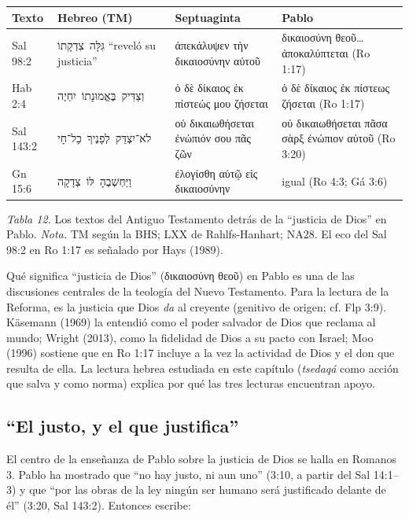 \documentclass[11pt,letterpaper]{article}
\newcommand{\heb}[1]{\mbox{\foreignlanguage{hebrew}{#1}}}
\newcommand{\grc}[1]{\foreignlanguage{ancientgreek}{#1}}
\begin{document}
\begin{center}\small\renewcommand{\arraystretch}{1.2}
\begin{tabular}{@{}L{2.4cm}L{4.4cm}L{4.4cm}L{3.4cm}@{}}
\toprule
\textbf{Texto} & \textbf{Hebreo (TM)} & \textbf{Septuaginta} & \textbf{Pablo} \\ \midrule
Sal 98:2 & \heb{גִּלָּה צִדְקָתוֹ} ``reveló su justicia'' & \grc{ἀπεκάλυψεν τὴν δικαιοσύνην αὐτοῦ} & \grc{δικαιοσύνη θεοῦ\ldots{} ἀποκαλύπτεται} (Ro 1:17) \\
Hab 2:4 & \heb{וְצַדִּיק בֶּאֱמוּנָתוֹ יִחְיֶה} & \grc{ὁ δὲ δίκαιος ἐκ πίστεώς μου ζήσεται} & \grc{ὁ δὲ δίκαιος ἐκ πίστεως ζήσεται} (Ro 1:17) \\
Sal 143:2 & \heb{לֹא־יִצְדַּק לְפָנֶיךָ כָל־חָי} & \grc{οὐ δικαιωθήσεται ἐνώπιόν σου πᾶς ζῶν} & \grc{οὐ δικαιωθήσεται πᾶσα σὰρξ ἐνώπιον αὐτοῦ} (Ro 3:20) \\
Gn 15:6 & \heb{וַיַּחְשְׁבֶהָ לּוֹ צְדָקָה} & \grc{ἐλογίσθη αὐτῷ εἰς δικαιοσύνην} & igual (Ro 4:3; Gá 3:6) \\
\bottomrule
\end{tabular}\par
{\footnotesize\color{gris}\textit{Tabla 12.} Los textos del Antiguo Testamento detrás de la ``justicia de Dios'' en Pablo. \textit{Nota.} TM según la BHS; LXX de Rahlfs-Hanhart; NA28. El eco del Sal 98:2 en Ro 1:17 es señalado por Hays (1989).}
\end{center}

\begin{nota}[Precisión]
Qué significa ``justicia de Dios'' (\grc{δικαιοσύνη θεοῦ}) en Pablo es una de las discusiones centrales de la teología del Nuevo Testamento. Para la lectura de la Reforma, es la justicia que Dios \emph{da} al creyente (genitivo de origen; cf. Flp 3:9). Käsemann (1969) la entendió como el poder salvador de Dios que reclama al mundo; Wright (2013), como la fidelidad de Dios a su pacto con Israel; Moo (1996) sostiene que en Ro 1:17 incluye a la vez la actividad de Dios y el don que resulta de ella. La lectura hebrea estudiada en este capítulo (\emph{tsedaqá} como acción que salva y como norma) explica por qué las tres lecturas encuentran apoyo.
\end{nota}

\subsection{``El justo, y el que justifica''}
El centro de la enseñanza de Pablo sobre la justicia de Dios se halla en Romanos 3. Pablo ha mostrado que ``no hay justo, ni aun uno'' (3:10, a partir del Sal 14:1--3) y que ``por las obras de la ley ningún ser humano será justificado delante de él'' (3:20, Sal 143:2). Entonces escribe:
\end{document}
